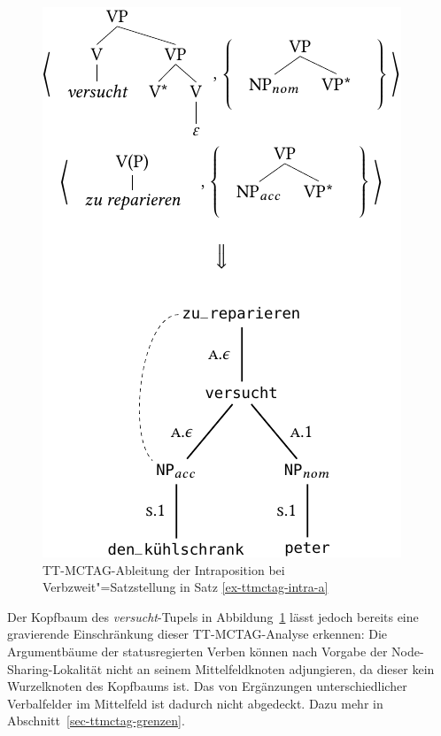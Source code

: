 \begin{figure}[t]
\centering
\includegraphics{graphics/abb714.pdf}
\caption{\label{fig-ttmctag-koh1}TT-MCTAG-Ableitung der Intraposition bei Verbzweit"=Satzstellung in Satz \ref{ex-ttmctag-intra-a}}
\end{figure}

Der Kopfbaum des {\it versucht}-Tupels in Abbildung~\ref{fig-ttmctag-koh1} lässt jedoch bereits eine gravierende Einschränkung dieser TT-MCTAG-Analyse erkennen: Die Argumentbäume der statusregierten Verben können nach Vorgabe der Node-Sharing-Lokalität nicht an seinem Mittelfeldknoten adjungieren, da dieser kein Wurzelknoten des Kopfbaums ist. Das  von Ergänzungen unterschiedlicher Verbalfelder im Mittelfeld ist dadurch nicht abgedeckt. Dazu mehr in Abschnitt~\ref{sec-ttmctag-grenzen}.

